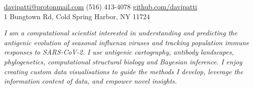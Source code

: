 \documentclass[10pt,a4paper]{article}
\begin{document}
\sloppy  %


\nobreakvspace{0.3em}  %

\noindent\href{mailto:davipatti@protonmail.com}{davipatti\mbox{}@\mbox{}protonmail.com}\sbull
{} (516) 413-4078\sbull
\href{https://github.com/davipatti}{github.com/davipatti}
\\
1 Bungtown Rd, Cold Spring Harbor, NY 11724

\spacedhrule{0.5em}{-0.4em}  %


\begin{multicols}{2}
  \noindent \emph{I am a computational scientist interested in understanding and
    predicting the antigenic evolution of seasonal influenza viruses and
    tracking population immune responses to SARS-CoV-2. I use antigenic
    cartography, antibody landscapes, phylogenetics, computational structural
    biology and Bayesian inference. I enjoy creating custom
    data visualisations to guide the methods I develop, leverage the information
    content of data, and empower novel insights.}
\end{multicols}

\spacedhrule{0.9em}{-0.4em}

\end{document}
